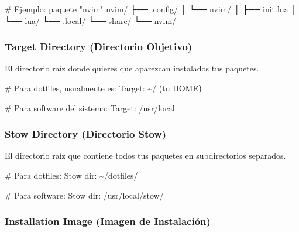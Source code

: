\documentclass[
  doc,
  floatsintext,
  longtable,
  a4paper,
  nolmodern,
  notxfonts,
  notimes,
  12pt,
  colorlinks=true,linkcolor=blue,citecolor=blue,urlcolor=blue]{apa7}
\newenvironment{Shaded}{\begin{snugshade}}{\end{snugshade}}
\newcommand{\CommentTok}[1]{\textcolor[rgb]{0.37,0.37,0.37}{#1}}
\newcommand{\ErrorTok}[1]{\textcolor[rgb]{0.68,0.00,0.00}{#1}}
\newcommand{\ExtensionTok}[1]{\textcolor[rgb]{0.00,0.23,0.31}{#1}}
\newcommand{\KeywordTok}[1]{\textcolor[rgb]{0.00,0.23,0.31}{\textbf{#1}}}
\newcommand{\NormalTok}[1]{\textcolor[rgb]{0.00,0.23,0.31}{#1}}
\begin{document}
\begin{Shaded}
\begin{Highlighting}[]
\CommentTok{\# Ejemplo: paquete "nvim"}
\ExtensionTok{nvim/}
\ExtensionTok{├──}\NormalTok{ .config/}
\ExtensionTok{│}\NormalTok{   └── nvim/}
\ExtensionTok{│}\NormalTok{       ├── init.lua}
\ExtensionTok{│}\NormalTok{       └── lua/}
\ExtensionTok{└──}\NormalTok{ .local/}
    \ExtensionTok{└──}\NormalTok{ share/}
        \ExtensionTok{└──}\NormalTok{ nvim/}
\end{Highlighting}
\end{Shaded}

\subsubsection{Target Directory (Directorio
Objetivo)}\label{target-directory-directorio-objetivo}

El directorio raíz donde quieres que aparezcan instalados tus paquetes.

\begin{Shaded}
\begin{Highlighting}[]
\CommentTok{\# Para dotfiles, usualmente es:}
\ExtensionTok{Target:}\NormalTok{ \textasciitilde{}/ }\ErrorTok{(}\ExtensionTok{tu}\NormalTok{ HOME}\KeywordTok{)}

\CommentTok{\# Para software del sistema:}
\ExtensionTok{Target:}\NormalTok{ /usr/local}
\end{Highlighting}
\end{Shaded}

\subsubsection{Stow Directory (Directorio
Stow)}\label{stow-directory-directorio-stow}

El directorio raíz que contiene todos tus paquetes en subdirectorios
separados.

\begin{Shaded}
\begin{Highlighting}[]
\CommentTok{\# Para dotfiles:}
\ExtensionTok{Stow}\NormalTok{ dir: \textasciitilde{}/dotfiles/}

\CommentTok{\# Para software:}
\ExtensionTok{Stow}\NormalTok{ dir: /usr/local/stow/}
\end{Highlighting}
\end{Shaded}

\subsubsection{Installation Image (Imagen de
Instalación)}\label{installation-image-imagen-de-instalaciuxf3n}
\end{document}
